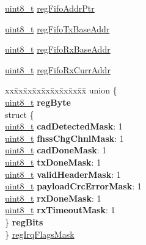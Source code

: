 \begin{DoxyCompactItemize}
\begin{tabbing}
\end{tabbing}\item 
\hyperlink{vl53l0x__types_8h_aba7bc1797add20fe3efdf37ced1182c5}{uint8\+\_\+t} \hyperlink{structFSK__Register__Map_acca50b6b3dacf0805dfbf5f125a7e513}{reg\+Fifo\+Addr\+Ptr}
\item 
\hyperlink{vl53l0x__types_8h_aba7bc1797add20fe3efdf37ced1182c5}{uint8\+\_\+t} \hyperlink{structFSK__Register__Map_ab2301d5a9696c7b28fa27539184c8b4a}{reg\+Fifo\+Tx\+Base\+Addr}
\item 
\hyperlink{vl53l0x__types_8h_aba7bc1797add20fe3efdf37ced1182c5}{uint8\+\_\+t} \hyperlink{structFSK__Register__Map_a62acebd7a0eab21ec4e8297e1343b403}{reg\+Fifo\+Rx\+Base\+Addr}
\item 
\hyperlink{vl53l0x__types_8h_aba7bc1797add20fe3efdf37ced1182c5}{uint8\+\_\+t} \hyperlink{structFSK__Register__Map_ad3c835e670be1d48e7d7c45f23b2d578}{reg\+Fifo\+Rx\+Curr\+Addr}
\item 
\begin{tabbing}
xx\=xx\=xx\=xx\=xx\=xx\=xx\=xx\=xx\=\kill
union \{\\
\>\hyperlink{vl53l0x__types_8h_aba7bc1797add20fe3efdf37ced1182c5}{uint8\_t} {\bfseries regByte}\\
\>struct \{\\
\>\>\hyperlink{vl53l0x__types_8h_aba7bc1797add20fe3efdf37ced1182c5}{uint8\_t} {\bfseries cadDetectedMask}: 1\\
\>\>\hyperlink{vl53l0x__types_8h_aba7bc1797add20fe3efdf37ced1182c5}{uint8\_t} {\bfseries fhssChgChnlMask}: 1\\
\>\>\hyperlink{vl53l0x__types_8h_aba7bc1797add20fe3efdf37ced1182c5}{uint8\_t} {\bfseries cadDoneMask}: 1\\
\>\>\hyperlink{vl53l0x__types_8h_aba7bc1797add20fe3efdf37ced1182c5}{uint8\_t} {\bfseries txDoneMask}: 1\\
\>\>\hyperlink{vl53l0x__types_8h_aba7bc1797add20fe3efdf37ced1182c5}{uint8\_t} {\bfseries validHeaderMask}: 1\\
\>\>\hyperlink{vl53l0x__types_8h_aba7bc1797add20fe3efdf37ced1182c5}{uint8\_t} {\bfseries payloadCrcErrorMask}: 1\\
\>\>\hyperlink{vl53l0x__types_8h_aba7bc1797add20fe3efdf37ced1182c5}{uint8\_t} {\bfseries rxDoneMask}: 1\\
\>\>\hyperlink{vl53l0x__types_8h_aba7bc1797add20fe3efdf37ced1182c5}{uint8\_t} {\bfseries rxTimeoutMask}: 1\\
\>\} {\bfseries regBits}\\
\} \hyperlink{structFSK__Register__Map_a0d7ff48d3b38bbe8f82b326d70e20f60}{regIrqFlagsMask}\\


\end{tabbing}
\end{DoxyCompactItemize}
